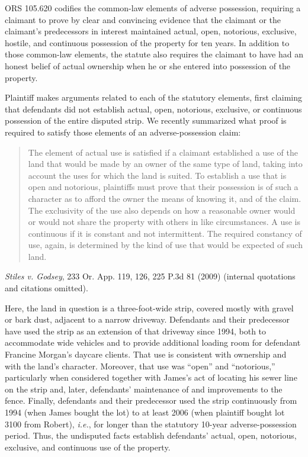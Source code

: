 ORS 105.620 codifies the common-law elements of adverse possession, requiring a
claimant to prove by clear and convincing evidence that the claimant or the
claimant's predecessors in interest maintained actual, open, notorious,
exclusive, hostile, and continuous possession of the property for ten years. In
addition to those common-law elements, the statute also requires the claimant
to have had an honest belief of actual ownership when he or she entered into
possession of the property.

Plaintiff makes arguments related to each of the statutory elements, first
claiming that defendants did not establish actual, open, notorious, exclusive,
or continuous possession of the entire disputed strip. We recently summarized
what proof is required to satisfy those elements of an adverse-possession
claim:
\begin{quote}
The element of actual use is satisfied if a claimant established a use of
the land that would be made by an owner of the same type of land, taking into
account the uses for which the land is suited. To establish a use that is open
and notorious, plaintiffs must prove that their possession is of such a
character as to afford the owner the means of knowing it, and of the claim. The
exclusivity of the use also depends on how a reasonable owner would or would
not share the property with others in like circumstances. A use is continuous
if it is constant and not intermittent. The required constancy of use,
again, is determined by the kind of use that would be expected of such land.
\end{quote}
\textit{Stiles v. Godsey}, 233 Or. App. 119, 126, 225 P.3d 81 (2009) (internal
quotations and citations omitted).

Here, the land in question is a three-foot-wide strip, covered mostly with
gravel or bark dust, adjacent to a narrow driveway. Defendants and their
predecessor have used the strip as an extension of that driveway since 1994,
both to accommodate wide vehicles and to provide additional loading room for
defendant Francine Morgan's daycare clients. That use is consistent with
ownership and with the land's character. Moreover, that use was ``open'' and
``notorious,'' particularly when considered together with James's act of
locating his sewer line on the strip and, later, defendants' maintenance of and
improvements to the fence. Finally, defendants and their predecessor used the
strip continuously from 1994 (when James bought the lot) to at least 2006 (when
plaintiff bought lot 3100 from Robert), \textit{i.e.}, for longer than the
statutory 10-year adverse-possession period. Thus, the undisputed facts
establish defendants' actual, open, notorious, exclusive, and continuous use of
the property.

